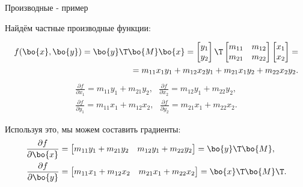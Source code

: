 \documentclass{beamer}
\begin{document}
\begin{frame}{Производные - пример}
	\begin{flushleft}
		
		Найдём частные производные функции:
		
		\begin{align}
			f(\bo{x}, \bo{y}) = \bo{y}\T \bo{M} \bo{x} = 
			\begin{bmatrix}
				y_1 \\ y_2
			\end{bmatrix}\T
			\begin{bmatrix}
				m_{11} & m_{12} \\
				m_{21} & m_{22}
			\end{bmatrix}
			\begin{bmatrix}
				x_1 \\ x_2
			\end{bmatrix} =
			\\
			= m_{11} x_1 y_1 + m_{12} x_2 y_1 + m_{21} x_1 y_2 + m_{22} x_2 y_2 .
		\end{align}
		\begin{align}
			\frac{\partial f}{\partial x_1} = m_{11} y_1  + m_{21}  y_2,
			\ \ \
			\frac{\partial f}{\partial x_2} =  m_{12} y_1 + m_{22} y_2,
			\\
			\frac{\partial f}{\partial y_1} = m_{11} x_1 + m_{12} x_2,
			\ \ \
			\frac{\partial f}{\partial y_2} =  m_{21} x_1 + m_{22} x_2.
		\end{align}
		
		Используя это, мы можем составить градиенты:
		\begin{align}
			\frac{\partial f}{\partial \bo{x}} &= 
			\begin{bmatrix}
				m_{11} y_1  + m_{21}  y_2 & m_{12} y_1 + m_{22} y_2
			\end{bmatrix}
			=
			\bo{y}\T \bo{M},
			\\
			\frac{\partial f}{\partial \bo{y}} &= 
			\begin{bmatrix}
				m_{11} x_1 + m_{12} x_2 & m_{21} x_1 + m_{22} x_2
			\end{bmatrix}
			=
			\bo{x}\T \bo{M}\T.
		\end{align}
		
		
	\end{flushleft}
\end{frame}
\end{document}
